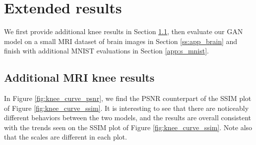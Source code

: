 \begin{table}[!ht]
\centering
{}
    \caption{Evaluator architecture \citep{zhang2019reducing}. First, spectral maps are created and concatenated with an embedded mask. Then, the data is processed through convolutional layers, using $\text{LeakyReLU}(0.2)$ and instance normalization. This results in a total of $97.7$ million parameters.}\label{tab:evaluator}
\end{table}


\clearpage
\FloatBarrier
\section{Extended results}
We first provide additional knee results in Section \ref{ss:app_knee}, then evaluate our GAN model on a small MRI dataset of brain images in Section \ref{ss:app_brain} and finish with additional MNIST evaluations in Section \ref{app:s_mnist}.

\subsection{Additional MRI knee results}\label{ss:app_knee}
In Figure \ref{fig:knee_curve_psnr}, we find the PSNR counterpart of the SSIM plot of Figure \ref{fig:knee_curve_ssim}. It is interesting to see that there are noticeably different behaviors between the two models, and the results are overall consistent with the trends seen on the SSIM plot of Figure \ref{fig:knee_curve_ssim}. Note also that the scales are different in each plot.

